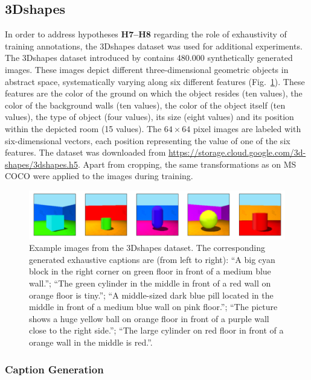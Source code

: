 \subsection{3Dshapes}
\label{ds:3dshapes}
In order to address hypotheses \textbf{H7--H8} regarding the role of exhaustivity of training annotations, the 3Dshapes dataset was used for additional experiments. The 3Dshapes dataset introduced by \textcite{burgess20183d} contains 480.000 synthetically generated images. These images depict different three-dimensional geometric objects in abstract space, systematically varying along six different features (Fig.~\ref{fig:3dshapes_example}). These features are the color of the ground on which the object resides (ten values), the color of the background walls (ten values), the color of the object itself (ten values), the type of object (four values), its size (eight values) and its position within the depicted room (15 values). 
The $64\times64$ pixel images are labeled with six-dimensional vectors, each position representing the value of one of the six features.
The dataset was downloaded from \url{https://storage.cloud.google.com/3d-shapes/3dshapes.h5}. Apart from cropping, the same transformations as on MS COCO were applied to the images during training.
\begin{figure}
\centering
\includegraphics[width=\linewidth]{images/3dshapes_example.png}
\caption{Example images from the 3Dshapes dataset. The corresponding generated exhaustive captions are (from left to right): ``A big cyan block in the right corner on green floor in front of a medium blue wall.''; ``The green cylinder in the middle in front of a red wall on orange floor is tiny.''; ``A middle-sized dark blue pill located in the middle in front of a medium blue wall on pink floor.''; ``The picture shows a huge yellow ball on orange floor in front of a purple wall close to the right side.''; ``The large cylinder on red floor in front of a orange wall in the middle is red.''.}
\label{fig:3dshapes_example}
\end{figure}  

\subsubsection{Caption Generation}

